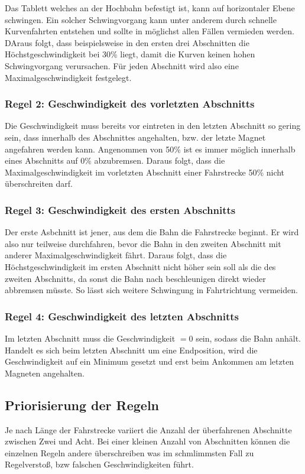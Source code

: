 Das Tablett welches an der Hochbahn befestigt ist, kann auf horizontaler Ebene schwingen. Ein solcher Schwingvorgang kann unter anderem durch schnelle Kurvenfahrten entstehen und sollte in möglichst allen Fällen vermieden werden. DAraus folgt, dass beispielsweise in den ersten drei Abschnitten die Höchstgeschwindigkeit bei 30\% liegt, damit die Kurven keinen hohen Schwingvorgang verursachen. Für jeden Abschnitt wird also eine Maximalgeschwindigkeit festgelegt.

\subsubsection{Regel 2: Geschwindigkeit des vorletzten Abschnitts}
Die Geschwindigkeit muss bereits vor eintreten in den letzten Abschnitt so gering sein, dass innerhalb des Abschnittes angehalten, bzw. der letzte Magnet angefahren werden kann. Angenommen von 50\% ist es immer möglich innerhalb eines Abschnitts auf 0\% abzubremsen. Daraus folgt, dass die Maximalgeschwindigkeit im vorletzten Abschnitt einer Fahrstrecke 50\% nicht überschreiten darf. 

\subsubsection{Regel 3: Geschwindigkeit des ersten Abschnitts}
Der erste Asbchnitt ist jener, aus dem die Bahn die Fahrstrecke beginnt. Er wird also nur teilweise durchfahren, bevor die Bahn in den zweiten Abschnitt mit anderer Maximalgeschwindigkeit fährt. Daraus folgt, dass die Höchstgeschwindigkeit im ersten Abschnitt nicht höher sein soll als die des zweiten Abschnitts, da sonst die Bahn nach beschleunigen direkt wieder abbremsen müsste. So lässt sich weitere Schwingung in Fahrtrichtung vermeiden.

\subsubsection{Regel 4: Geschwindigkeit des letzten Abschnitts}
Im letzten Abschnitt muss die Geschwindigkeit $= 0$ sein, sodass die Bahn anhält. Handelt es sich beim letzten Abschnitt um eine Endposition, wird die Geschwindigkeit auf ein Minimum gesetzt und erst beim Ankommen am letzten Magneten angehalten.  

\subsection{Priorisierung der Regeln}
Je nach Länge der Fahrstrecke variiert die Anzahl der überfahrenen Abschnitte zwischen Zwei und Acht. Bei einer kleinen Anzahl von Abschnitten können die einzelnen Regeln andere überschreiben was im schmlimmsten Fall zu Regelverstoß, bzw falschen Geschwindigkeiten führt. 

